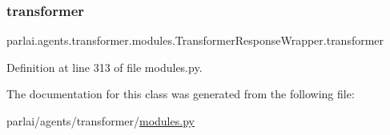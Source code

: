 \subsubsection{\texorpdfstring{transformer}{transformer}}
{\footnotesize\ttfamily parlai.\+agents.\+transformer.\+modules.\+Transformer\+Response\+Wrapper.\+transformer}



Definition at line 313 of file modules.\+py.



The documentation for this class was generated from the following file\+:\begin{DoxyCompactItemize}
\item 
parlai/agents/transformer/\hyperlink{parlai_2agents_2transformer_2modules_8py}{modules.\+py}\end{DoxyCompactItemize}
